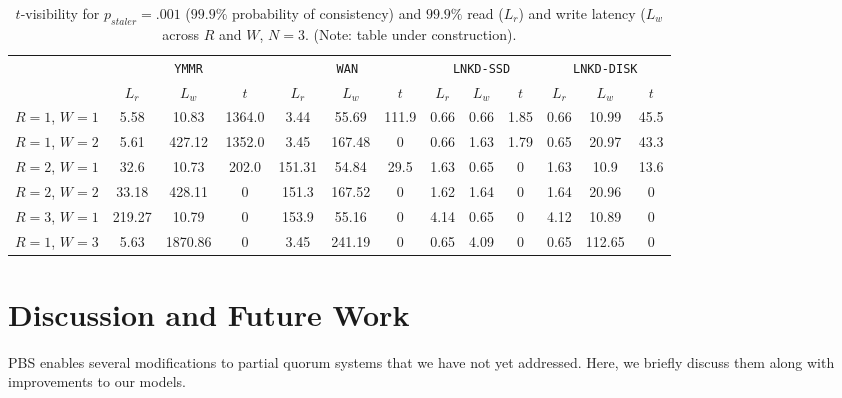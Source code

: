 \documentclass{vldb}
\begin{document}
\begin{table}
\centering
\begin{tabular}{c|c|c|c|c|c|c|c|c|c|c|c|c|}
\cline{2-13}
& \multicolumn{3}{|c|}{\texttt{YMMR}} & \multicolumn{3}{|c|}{\texttt{WAN}} & \multicolumn{3}{|c|}{\texttt{LNKD-SSD}} & \multicolumn{3}{|c|}{\texttt{LNKD-DISK}}\\
&\multicolumn{1}{|c}{$L_r$}  & \multicolumn{1}{c}{$L_w$} & \multicolumn{1}{c|}{$t$} &  \multicolumn{1}{|c}{$L_r$} & \multicolumn{1}{c}{$L_w$} & \multicolumn{1}{c|}{$t$} &  \multicolumn{1}{|c}{$L_r$} & \multicolumn{1}{c}{$L_w$} & \multicolumn{1}{c|}{$t$} &  \multicolumn{1}{|c}{$L_r$} & \multicolumn{1}{c}{$L_w$} & \multicolumn{1}{c|}{$t$} \\\hline
\multicolumn{1}{|c|}{$R$$=$$1$, $W$$=$$1$}
& 5.58 & 10.83 & 1364.0 & 3.44 & 55.69 & 111.9 & 0.66 & 0.66 & 1.85 & 0.66 & 10.99 & 45.5 \\
\multicolumn{1}{|c|}{$R$$=$$1$, $W$$=$$2$}
& 5.61 & 427.12 & 1352.0 & 3.45 & 167.48 & 0 & 0.66 & 1.63 & 1.79 & 0.65 & 20.97 & 43.3 \\
\multicolumn{1}{|c|}{$R$$=$$2$, $W$$=$$1$}
& 32.6 & 10.73 & 202.0 & 151.31 & 54.84 & 29.5 & 1.63 & 0.65 & 0 & 1.63 & 10.9 & 13.6 \\
\multicolumn{1}{|c|}{$R$$=$$2$, $W$$=$$2$}
& 33.18 & 428.11 & 0 & 151.3 & 167.52 & 0 & 1.62 & 1.64 & 0 & 1.64 & 20.96 & 0 \\
\multicolumn{1}{|c|}{$R$$=$$3$, $W$$=$$1$}
& 219.27 & 10.79 & 0 & 153.9 & 55.16 & 0 & 4.14 & 0.65 & 0 & 4.12 & 10.89 & 0 \\
\multicolumn{1}{|c|}{$R$$=$$1$, $W$$=$$3$}
& 5.63 & 1870.86 & 0 & 3.45 & 241.19 & 0 & 0.65 & 4.09 & 0 & 0.65 & 112.65 & 0 \\
\hline
\end{tabular}
\caption{$t$-visibility for $p_{staler} = .001$ ($99.9\%$ probability of consistency) and $99.9\%$ read ($L_r$) and write latency ($L_w$ across $R$ and $W$, $N$$=$$3$. (Note: table under construction).}
\label{table:lat-stale}
\end{table}


\section{Discussion and Future Work}
\label{sec:discussion}

PBS enables several modifications to partial quorum systems that we
have not yet addressed.  Here, we briefly discuss them along with
improvements to our models.
\end{document}
